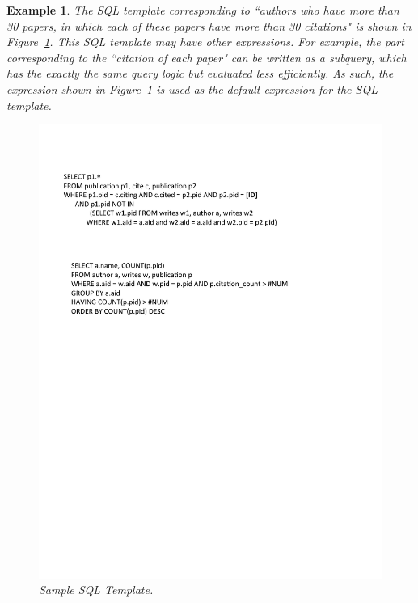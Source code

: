 \documentclass{vldb}
\newtheorem{example}{Example}
\begin{document}
\begin{example}
\label{example:example1}
The SQL template corresponding to ``authors who have more than 30 papers, in which each of these papers have more than 30 citations" is shown in Figure~\ref{fig:sampleTemplate}.  This SQL template may have other expressions.  For example, the part corresponding to the ``citation of each paper" can be written as a subquery, which has the exactly the same query logic but evaluated less efficiently.  As such, the expression shown in Figure~\ref{fig:sampleTemplate} is used as the default expression for the SQL template.  
\begin{figure}[h]
\center
\includegraphics[width=1\linewidth]{pic/sampleTemplate.pdf}
\caption{Sample SQL Template.}
\label{fig:sampleTemplate}
\end{figure}
\end{example}
\end{document}
